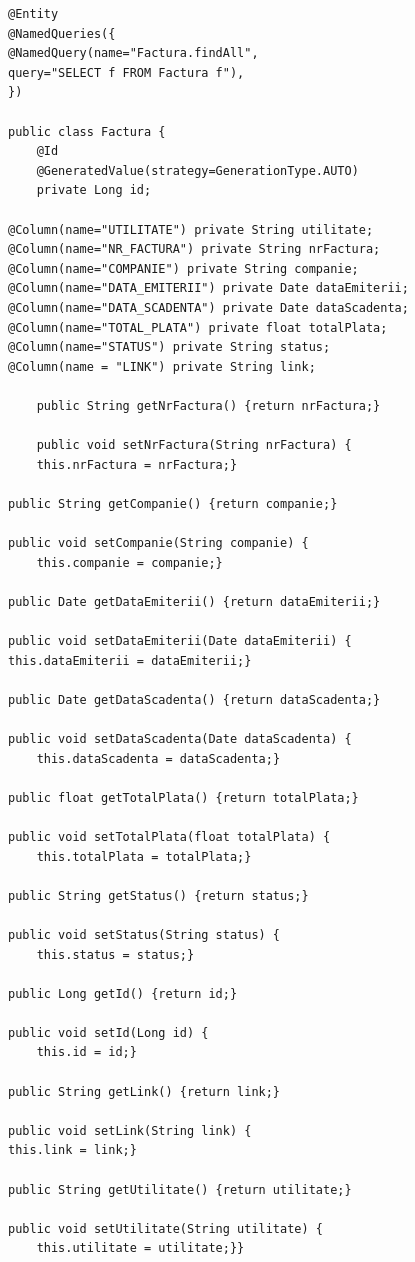 \documentclass[12pt]{book}
\begin{document}
\begin{lstlisting}[frame=single, caption=Maparea la numele coloanelor bazei de date cu ajutorul adnotărilor]
@Entity
@NamedQueries({
@NamedQuery(name="Factura.findAll",
query="SELECT f FROM Factura f"),
})

public class Factura {
	@Id
	@GeneratedValue(strategy=GenerationType.AUTO)
	private Long id;
	
@Column(name="UTILITATE") private String utilitate;
@Column(name="NR_FACTURA") private String nrFactura;
@Column(name="COMPANIE") private String companie;	
@Column(name="DATA_EMITERII") private Date dataEmiterii;	
@Column(name="DATA_SCADENTA") private Date dataScadenta;	
@Column(name="TOTAL_PLATA") private float totalPlata;	
@Column(name="STATUS") private String status;	
@Column(name = "LINK") private String link;

	public String getNrFactura() {return nrFactura;}
	
	public void setNrFactura(String nrFactura) {
	this.nrFactura = nrFactura;}

public String getCompanie() {return companie;}

public void setCompanie(String companie) {
	this.companie = companie;}

public Date getDataEmiterii() {return dataEmiterii;}

public void setDataEmiterii(Date dataEmiterii) {
this.dataEmiterii = dataEmiterii;}

public Date getDataScadenta() {return dataScadenta;}

public void setDataScadenta(Date dataScadenta) {
	this.dataScadenta = dataScadenta;}

public float getTotalPlata() {return totalPlata;}

public void setTotalPlata(float totalPlata) {
	this.totalPlata = totalPlata;}

public String getStatus() {return status;}

public void setStatus(String status) {
	this.status = status;}

public Long getId() {return id;}

public void setId(Long id) {
	this.id = id;}

public String getLink() {return link;}

public void setLink(String link) {
this.link = link;}

public String getUtilitate() {return utilitate;}

public void setUtilitate(String utilitate) {
	this.utilitate = utilitate;}}
\end{lstlisting}
\end{document}
